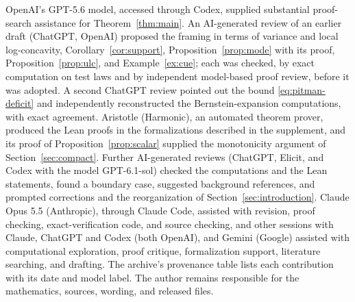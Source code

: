 \documentclass[ECP]{ejpecp}
\begin{document}
\medskip
\begin{acks}
OpenAI's GPT-5.6 model, accessed through Codex, supplied substantial
proof-search assistance for Theorem~\ref{thm:main}. An AI-generated review of
an earlier draft (ChatGPT, OpenAI) proposed the framing in terms of variance
and local log-concavity, Corollary~\ref{cor:support},
Proposition~\ref{prop:mode} with its proof, Proposition~\ref{prop:ulc}, and
Example~\ref{ex:cue}; each was checked, by exact computation on test laws and
by independent model-based proof review, before it was adopted. A second
ChatGPT review pointed out the bound \eqref{eq:pitman-deficit} and
independently reconstructed the Bernstein-expansion computations, with exact
agreement. Aristotle (Harmonic), an automated theorem prover, produced the
Lean proofs in the formalizations described in the supplement, and its proof
of Proposition~\ref{prop:scalar} supplied the monotonicity argument of
Section~\ref{sec:compact}. Further AI-generated reviews (ChatGPT, Elicit, and
Codex with the model GPT-6.1-sol) checked the computations and the Lean
statements, found a boundary case, suggested background references, and
prompted corrections and the reorganization of
Section~\ref{sec:introduction}. Claude Opus 5.5 (Anthropic), through Claude
Code, assisted with revision, proof checking, exact-verification code, and
source checking, and other sessions with Claude, ChatGPT and Codex (both
OpenAI), and Gemini (Google) assisted with computational exploration, proof
critique, formalization support, literature searching, and drafting. The
archive's provenance table lists each contribution with its date and model
label. The author remains responsible for the mathematics, sources, wording,
and released files.
\end{acks}
\end{document}

